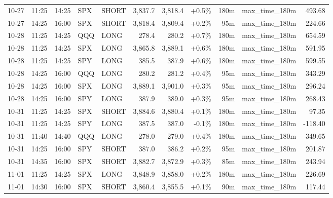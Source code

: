 \documentclass[11pt,a4paper,twoside]{article}
\begin{document}
\begin{center}
\begin{longtable}{>{\color{txtmain}}l l l l l r r r r >{\color{txtmain}}l r}
10-27 & 11:25 & 14:25 & SPX & SHORT & 3,837.7 & 3,818.4 & \textcolor{wingreen}{+0.5\%} & 180m & max\_time\_180m & \textcolor{wingreen}{493.68} \\
10-27 & 14:25 & 16:00 & SPX & SHORT & 3,818.4 & 3,809.4 & \textcolor{wingreen}{+0.2\%} & 95m & max\_time\_180m & \textcolor{wingreen}{224.66} \\
10-28 & 11:25 & 14:25 & QQQ & LONG & 278.4 & 280.2 & \textcolor{wingreen}{+0.7\%} & 180m & max\_time\_180m & \textcolor{wingreen}{654.59} \\
10-28 & 11:25 & 14:25 & SPX & LONG & 3,865.8 & 3,889.1 & \textcolor{wingreen}{+0.6\%} & 180m & max\_time\_180m & \textcolor{wingreen}{591.95} \\
10-28 & 11:25 & 14:25 & SPY & LONG & 385.5 & 387.9 & \textcolor{wingreen}{+0.6\%} & 180m & max\_time\_180m & \textcolor{wingreen}{599.55} \\
10-28 & 14:25 & 16:00 & QQQ & LONG & 280.2 & 281.2 & \textcolor{wingreen}{+0.4\%} & 95m & max\_time\_180m & \textcolor{wingreen}{343.29} \\
10-28 & 14:25 & 16:00 & SPX & LONG & 3,889.1 & 3,901.0 & \textcolor{wingreen}{+0.3\%} & 95m & max\_time\_180m & \textcolor{wingreen}{296.24} \\
10-28 & 14:25 & 16:00 & SPY & LONG & 387.9 & 389.0 & \textcolor{wingreen}{+0.3\%} & 95m & max\_time\_180m & \textcolor{wingreen}{268.43} \\
10-31 & 11:25 & 14:25 & SPX & SHORT & 3,884.6 & 3,880.4 & \textcolor{wingreen}{+0.1\%} & 180m & max\_time\_180m & \textcolor{wingreen}{97.35} \\
10-31 & 11:25 & 14:25 & SPY & LONG & 387.5 & 387.0 & \textcolor{lossred}{-0.1\%} & 180m & max\_time\_180m & \textcolor{lossred}{-118.40} \\
10-31 & 11:40 & 14:40 & QQQ & LONG & 278.0 & 279.0 & \textcolor{wingreen}{+0.4\%} & 180m & max\_time\_180m & \textcolor{wingreen}{349.65} \\
10-31 & 14:25 & 16:00 & SPY & SHORT & 387.0 & 386.2 & \textcolor{wingreen}{+0.2\%} & 95m & max\_time\_180m & \textcolor{wingreen}{201.87} \\
10-31 & 14:35 & 16:00 & SPX & SHORT & 3,882.7 & 3,872.9 & \textcolor{wingreen}{+0.3\%} & 85m & max\_time\_180m & \textcolor{wingreen}{243.94} \\
11-01 & 11:25 & 14:25 & SPX & LONG & 3,848.9 & 3,858.0 & \textcolor{wingreen}{+0.2\%} & 180m & max\_time\_180m & \textcolor{wingreen}{226.69} \\
11-01 & 14:30 & 16:00 & SPX & SHORT & 3,860.4 & 3,855.5 & \textcolor{wingreen}{+0.1\%} & 90m & max\_time\_180m & \textcolor{wingreen}{117.44} \\

\end{longtable}
\end{center}
\end{document}
